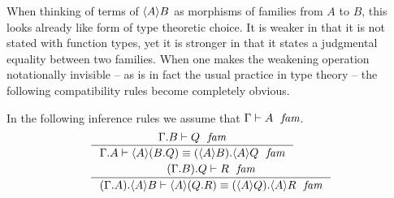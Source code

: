 When thinking of terms of $\ctxwk{A}{B}$ as morphisms of families from $A$ to
$B$, this looks already like form of type theoretic choice. It is weaker in that
it is not stated with function types, yet it is stronger in that it states a
judgmental equality between two families. When one makes the weakening operation
notationally invisible -- as is in fact the usual practice in type theory -- the
following compatibility rules become completely obvious.

In the following inference rules we assume that $\jfam{\Gamma}{A}$.
\begin{align}
& \inference
  {\jfam{\ctxext{\Gamma}{B}}{Q}}
  {\jfameq{\ctxext{\Gamma}{A}}{\ctxwk{A}{\ctxext{B}{Q}}}{\ctxext{\ctxwk{A}{B}}{\ctxwk{A}{Q}}}}\\
& \inference
  {\jfam{\ctxext{{\Gamma}{B}}{Q}}{R}}
  {\jfameq
    {\ctxext{{\Gamma}{A}}{\ctxwk{A}{B}}}
    {\ctxwk{A}{\ctxext{Q}{R}}}
    {\ctxext{\ctxwk{A}{Q}}{\ctxwk{A}{R}}}}
\end{align}

